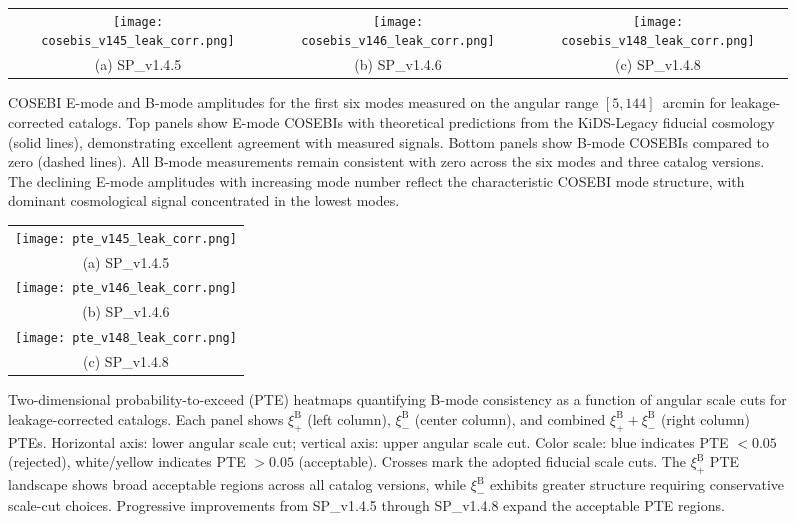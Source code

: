 \documentclass{aa}
\begin{document}
\begin{figure*}[htb]
\centering
\begin{tabular}{ccc}
\texttt{[image: cosebis\_v145\_leak\_corr.png]} &
\texttt{[image: cosebis\_v146\_leak\_corr.png]} &
\texttt{[image: cosebis\_v148\_leak\_corr.png]} \\
(a) SP\_v1.4.5 & (b) SP\_v1.4.6 & (c) SP\_v1.4.8
\end{tabular}
\caption{COSEBI E-mode and B-mode amplitudes for the first six modes measured on the angular range $[5, 144]$~arcmin for leakage-corrected catalogs. Top panels show E-mode COSEBIs with theoretical predictions from the KiDS-Legacy fiducial cosmology (solid lines), demonstrating excellent agreement with measured signals. Bottom panels show B-mode COSEBIs compared to zero (dashed lines). All B-mode measurements remain consistent with zero across the six modes and three catalog versions. The declining E-mode amplitudes with increasing mode number reflect the characteristic COSEBI mode structure, with dominant cosmological signal concentrated in the lowest modes.}
\label{fig:cosebis}
\end{figure*}

\begin{figure*}[hp]
\centering
\begin{tabular}{c}
\texttt{[image: pte\_v145\_leak\_corr.png]} \\
(a) SP\_v1.4.5 \\[6pt]
\texttt{[image: pte\_v146\_leak\_corr.png]} \\
(b) SP\_v1.4.6 \\[6pt]
\texttt{[image: pte\_v148\_leak\_corr.png]} \\
(c) SP\_v1.4.8
\end{tabular}
\caption{Two-dimensional probability-to-exceed (PTE) heatmaps quantifying B-mode consistency as a function of angular scale cuts for leakage-corrected catalogs. Each panel shows $\xi_+^{\mathrm{B}}$ (left column), $\xi_-^{\mathrm{B}}$ (center column), and combined $\xi_+^{\mathrm{B}} + \xi_-^{\mathrm{B}}$ (right column) PTEs. Horizontal axis: lower angular scale cut; vertical axis: upper angular scale cut. Color scale: blue indicates PTE $< 0.05$ (rejected), white/yellow indicates PTE $> 0.05$ (acceptable). Crosses mark the adopted fiducial scale cuts. The $\xi_+^{\mathrm{B}}$ PTE landscape shows broad acceptable regions across all catalog versions, while $\xi_-^{\mathrm{B}}$ exhibits greater structure requiring conservative scale-cut choices. Progressive improvements from SP\_v1.4.5 through SP\_v1.4.8 expand the acceptable PTE regions.}
\label{fig:pte_heatmaps}
\end{figure*}
\end{document}
